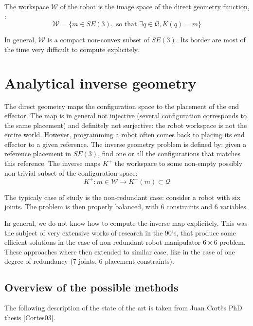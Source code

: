 \documentclass{book}
\begin{document}
The workspace $\mathcal{W}$ of the robot is the image space of the direct geometry function, \mie:
\[ \mathcal{W} = \Big\{ m \in SE(3), \textrm{ so that } \exists q \in \mathcal{Q}, K(q) = m \Big\} \]

In general, $\mathcal{W}$ is a compact non-convex subset of $SE(3)$. Its border are most of the time very difficult to compute explicitely.

\section{Analytical inverse geometry} \label{sec:anainvgeom}

The direct geometry maps the configuration space to the placement of the end effector. The map is in general not injective (several configuration corresponds to the same placement) and definitely not surjective: the robot workspace is not the entire world. However, programming a robot often comes back to placing its end effector to a given reference. The inverse geometry problem is defined by: given a reference placement in $SE(3)$, find one or all the configurations that matches this reference. The inverse maps $K^+$ the workspace to some non-empty  possibly non-trivial subset of the configuration space:
\[ K^+: m \in \mathcal{W} \rightarrow K^+(m) \subset \mathcal{Q} \]

The typicaly case of study is the non-redundant case: consider a robot with six joints. The problem is then properly balanced, with 6 constraints and 6 variables. 

In general, we do not know how to compute the inverse map explicitely. This was the subject of very extensive works of research in the 90's, that produce some efficient solutions in the case of non-redundant robot manipulator  $6 \times 6$ problem. These approaches where then extended to similar case, like in the case of one degree of redundancy (7 joints, 6 placement constraints).

\subsection{Overview of the possible methods}

The following description of the state of the art is taken from Juan Cort\`es PhD thesis [Cortes03].
\end{document}

